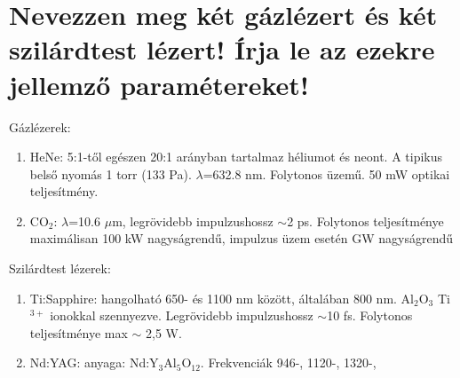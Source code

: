 \documentclass[12pt, a4paper]{article}
\begin{document}
\section{Nevezzen meg két gázlézert és két szilárdtest lézert! Írja le az ezekre jellemző paramétereket!}
Gázlézerek:
\begin{enumerate}
\item HeNe: 5:1-től egészen 20:1 arányban tartalmaz héliumot és neont. A tipikus belső nyomás 1 torr (133 Pa). $\lambda$=632.8 nm. Folytonos üzemű. 50 mW optikai teljesítmény.
\item CO$_2$: $\lambda$=10.6 $\mu$m, legrövidebb impulzushossz $\sim$2 ps. Folytonos teljesítménye maximálisan 100 kW nagyságrendű, impulzus üzem esetén GW nagyságrendű
\end{enumerate}	
Szilárdtest lézerek:	
\begin{enumerate}
\item Ti:Sapphire: hangolható 650- és 1100 nm között, általában 800 nm. Al$_2$O$_3$ Ti$^{3+}$ ionokkal szennyezve. Legrövidebb impulzushossz $\sim$10 fs. Folytonos teljesítménye max $\sim$ 2,5 W.
\item Nd:YAG: anyaga: Nd:Y$_3$Al$_5$O$_{12}$. Frekvenciák 946-, 1120-, 1320-, 
\end{enumerate}
\end{document}
